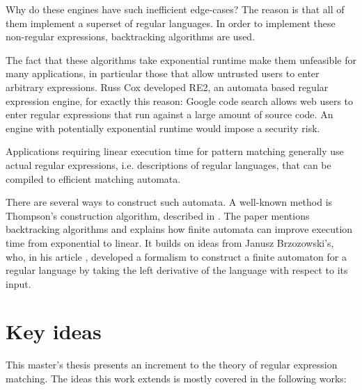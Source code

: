 Why do these engines have such inefficient edge-cases? The reason is that all of
them implement a superset of regular languages. In order to implement these
non-regular expressions, backtracking algorithms are used.

The fact that these algorithms take exponential runtime make them unfeasible for
many applications, in particular those that allow untrusted users to enter
arbitrary expressions. Russ Cox developed RE2, an automata based regular
expression engine, for exactly this reason: Google code search allows web users
to enter regular expressions that run against a large amount of source code. An
engine with potentially exponential runtime would impose a security risk.

Applications requiring linear execution time for pattern matching generally use
actual regular expressions, i.e. descriptions of regular languages, that can be
compiled to efficient matching automata.

There are several ways to construct such automata. A well-known method is
Thompson's construction algorithm, described in \cite{thompson}. The paper
mentions backtracking algorithms and explains how finite automata can improve
execution time from exponential to linear. It builds on ideas from Janusz
Brzozowski's, who, in his article \cite{brzozowski}, developed a formalism to
construct a finite automaton for a regular language by taking the left
derivative of the language with respect to its input.


\section{Key ideas}

This master's thesis presents an increment to the theory of regular expression
matching. The ideas this work extends is mostly covered in the following works:

